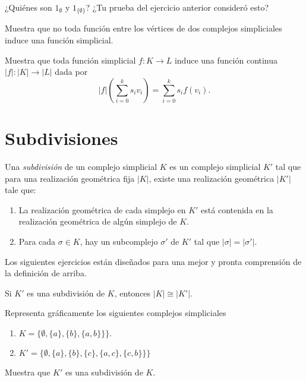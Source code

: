 \documentclass{standalone}
\begin{document}
	\begin{exercise}
		¿Quiénes son $1_{\emptyset}$ y $1_{\{\emptyset\}}$? ¿Tu prueba del ejercicio anterior consideró esto?
	\end{exercise}
	
	\begin{exercise}\label{rem:coeherent_gluing}
		Muestra que no toda función entre los vértices de dos complejos simpliciales induce una función simplicial. 
	\end{exercise}
	
	\begin{exercise}
		Muestra que toda función simplicial $f\colon K\rightarrow L$ induce una función continua $|f|\colon |K|\rightarrow |L|$ dada por 
		\[
		|f|(\sum_{i=0}^{k}s_{i}v_{i})= \sum_{i=0}^{k}s_{i}f(v_{i}).
		\]
	\end{exercise}
	
	\section{Subdivisiones}
	\begin{definition}\label{def:subdivision}
		Una \emph{subdivisión} de un complejo simplicial $K$ es un complejo simplicial $K'$ tal que para una realización geométrica fija $|K|$, existe una realización geométrica $|K'|$ tale que:
		
		\begin{enumerate}
			\item La realización geométrica de cada simplejo en $K'$ está contenida en la realización geométrica de algún simplejo de $K$.
			\item Para cada $\sigma\in K$, hay un subcomplejo $\sigma'$ de $K'$ tal que $|\sigma|=|\sigma'|$.
		\end{enumerate}
	\end{definition}
	
	Los siguientes ejercicios están diseñados para una mejor y pronta comprensión de la definición de arriba.
	
	\begin{exercise}
		Si $K'$ es una subdivisión de $K$, entonces $|K|\cong|K'|$.
	\end{exercise}
	
	\begin{exercise}
		Representa gráficamente los siguientes complejos simpliciales
		\begin{enumerate}
			\item  $K=\{\emptyset, \{a\}, \{b\}, \{a,b\}\}\}$.
			\item  $K'=\{\emptyset, \{a\}, \{b\}, \{c\}, \{a,c\}, \{c,b\}\}\}$
		\end{enumerate}
		Muestra que $K'$ es una subdivisión de $K$.
	\end{exercise}
	
\end{document}
